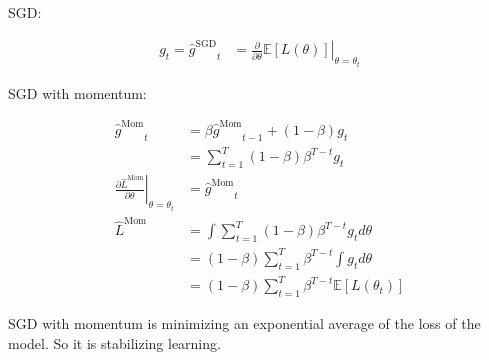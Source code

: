 \documentclass{article} %
\theoremstyle{plain}
\theoremstyle{definition}
\newcommand{\E}{{\mathbb{E}}}
\newcommand{\dth}[1]{{\frac{\partial {#1}}{\partial\theta}}}
\newcommand{\ST}{{\sum_{t=1}^T}}
\newcommand{\gSG}{{\hat{g}^{\text{SGD}}}}
\newcommand{\gMO}{{\hat{g}^{\text{Mom}}}}
\newcommand{\LMO}{{\hat{L}^{\text{Mom}}}}
\begin{document}
SGD:

\begin{align}
    g_t = \gSG_t &= \left.\dth{}\E[L(\theta)]\right|_{\theta=\theta_t}
\end{align}

SGD with momentum:

\begin{align}
    \gMO_t
    &= \beta \gMO_{t-1}+(1-\beta) g_t\\
    &= \ST (1-\beta) \beta^{T-t} g_t\\
    \left. \dth{\LMO} \right|_{\theta=\theta_t}&= \gMO_t\\
    \LMO
    &= \int \ST (1-\beta) \beta^{T-t} g_t d\theta\\
    &= (1-\beta)\ST \beta^{T-t} \int g_t d\theta\\
    &= (1-\beta)\ST \beta^{T-t} \E[L(\theta_t)]
\end{align}

SGD with momentum is minimizing an exponential average of the loss of the 
model. So it is stabilizing learning.
\end{document}
